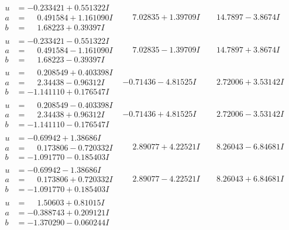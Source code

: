 \documentclass[1p]{elsarticle_modified}
\theoremstyle{definition}
\begin{document}
$$\begin{array}{c|c|c}
\begin{aligned}
u &= -0.233421 + 0.551322 I \\
a &= \phantom{-}0.491584 + 1.161090 I \\
b &= \phantom{-}1.68223 + 0.39397 I\end{aligned}
 & \phantom{-}7.02835 + 1.39709 I & \phantom{-}14.7897 - 3.8674 I \\ \hline\begin{aligned}
u &= -0.233421 - 0.551322 I \\
a &= \phantom{-}0.491584 - 1.161090 I \\
b &= \phantom{-}1.68223 - 0.39397 I\end{aligned}
 & \phantom{-}7.02835 - 1.39709 I & \phantom{-}14.7897 + 3.8674 I \\ \hline\begin{aligned}
u &= \phantom{-}0.208549 + 0.403398 I \\
a &= \phantom{-}2.34438 - 0.96312 I \\
b &= -1.141110 + 0.176547 I\end{aligned}
 & -0.71436 - 4.81525 I & \phantom{-}2.72006 + 3.53142 I \\ \hline\begin{aligned}
u &= \phantom{-}0.208549 - 0.403398 I \\
a &= \phantom{-}2.34438 + 0.96312 I \\
b &= -1.141110 - 0.176547 I\end{aligned}
 & -0.71436 + 4.81525 I & \phantom{-}2.72006 - 3.53142 I \\ \hline\begin{aligned}
u &= -0.69942 + 1.38686 I \\
a &= \phantom{-}0.173806 - 0.720332 I \\
b &= -1.091770 - 0.185403 I\end{aligned}
 & \phantom{-}2.89077 + 4.22521 I & \phantom{-}8.26043 - 6.84681 I \\ \hline\begin{aligned}
u &= -0.69942 - 1.38686 I \\
a &= \phantom{-}0.173806 + 0.720332 I \\
b &= -1.091770 + 0.185403 I\end{aligned}
 & \phantom{-}2.89077 - 4.22521 I & \phantom{-}8.26043 + 6.84681 I \\ \hline\begin{aligned}
u &= \phantom{-}1.50603 + 0.81015 I \\
a &= -0.388743 + 0.209121 I \\
b &= -1.370290 - 0.060244 I\end{aligned}

\end{array}$$
\end{document}
